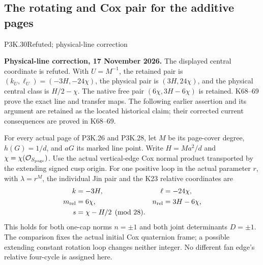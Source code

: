 \subsection{The rotating and Cox pair for the additive pages}
\begin{statement}{P3K.30}{Refuted; physical-line correction}\par\noindent\textbf{Physical-line correction, 17 November 2026.} The displayed central coordinate is refuted. With \(U=M^{-1}\), the retained pair is \((k_U,\ell_U)=(-3H,-24\chi)\), the physical pair is \((3H,24\chi)\), and the physical central class is \(H/2-\chi\). The native free pair \((6\chi,3H-6\chi)\) is retained. K68--69 prove the exact line and transfer maps. The following earlier assertion and its argument are retained as the located historical claim; their corrected current consequences are proved in K68--69.\medskip\par 

For every actual page of P3K.26 and P3K.28, let \(M\) be its page-cover degree,
\(h(G)=1/d\), and \(aG\) its marked line point. Write
\(H=Ma^2/d\) and \(\chi=\chi(\mathcal O_{S_{\rm page}})\).
Use the actual vertical-edge Cox normal product transported by the
extending signed cusp origin. For one positive loop in the actual
parameter \(r\), with \(\lambda=r^M\), the individual Jin pair and
the K23 relative coordinates are
\[
 \begin{aligned}
 k&=-3H,&\ell&=-24\chi,\\
 m_{\rm rel}&=6\chi,&n_{\rm rel}&=3H-6\chi,\\
 s&=\chi-H/2\pmod{28}.
 \end{aligned}
\]
This holds for both one-cap norms \(n=\pm1\) and both joint determinants
\(D=\pm1\). The comparison fixes the actual initial Cox quaternion
frame; a possible extending constant rotation loop changes neither
integer. No different fan edge's relative four-cycle is assigned here.

\end{statement}
